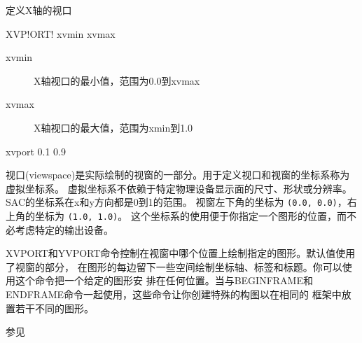 \label{cmd:xvport}

定义X轴的视口

\begin{SACSTX}
XVP!ORT! xvmin xvmax
\end{SACSTX}

\begin{description}
\item [xvmin] X轴视口的最小值，范围为0.0到xvmax
\item [xvmax] X轴视口的最大值，范围为xmin到1.0
\end{description}

\begin{SACDFT}
xvport 0.1 0.9
\end{SACDFT}

视口(viewspace)是实际绘制的视窗的一部分。用于定义视口和视窗的坐标系称为虚拟坐标系。
虚拟坐标系不依赖于特定物理设备显示面的尺寸、形状或分辨率。SAC的坐标系在x和y方向都是0到1的范围。
视窗左下角的坐标为 \texttt{(0.0, 0.0)}，右上角的坐标为 \texttt{(1.0, 1.0)}。
这个坐标系的使用便于你指定一个图形的位置，而不必考虑特定的输出设备。

XVPORT和YVPORT命令控制在视窗中哪个位置上绘制指定的图形。默认值使用了视窗的部分，
在图形的每边留下一些空间绘制坐标轴、标签和标题。你可以使用这个命令把一个给定的图形安
排在任何位置。当与BEGINFRAME和ENDFRAME命令一起使用，这些命令让你创建特殊的构图以在相同的
框架中放置若干不同的图形。

参见 
